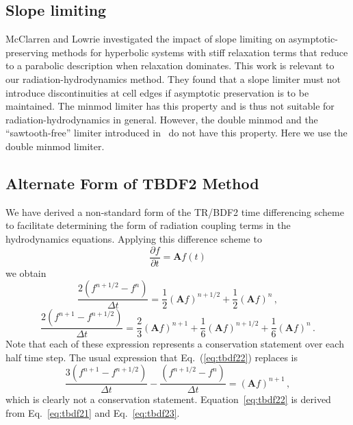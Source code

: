 \documentclass[preprint,12pt]{elsarticle}
\newcommand{\fn}[1]{\left( #1 \right)}
\newcommand{\dxdy}[2]{\frac{\partial #1}{\partial #2}}
\newcommand{\be}{\begin{equation}}
\newcommand{\ee}{\end{equation}}
\newcommand{\pec}{\, ,}
\newcommand{\pep}{\, .}
\newcommand{\lequ}[1]{\label{eq:#1}}
\newcommand{\equ}[1]{Eq.~(\ref{eq:#1})}
\newcommand{\half}{\frac{1}{2}}
\newcommand{\mA}{\mathbf{A}}
\begin{document}
\subsection{Slope limiting}
McClarren and Lowrie \cite{mclow2008} investigated the impact of slope limiting on asymptotic-preserving methods for hyperbolic systems with stiff 
relaxation terms that reduce to a parabolic description when relaxation dominates.  This work is relevant to our radiation-hydrodynamics method. 
They found that a slope limiter must not introduce discontinuities at cell edges if asymptotic preservation is to be maintained.  The minmod limiter 
has this property and is thus not suitable for radiation-hydrodynamics in general.  However, the double minmod and the ``sawtooth-free'' limiter 
introduced in~\cite{mclow2008} do not have this property.  Here we use the double minmod limiter.   


\subsection{Alternate Form of TBDF2 Method}
\label{sec:Alternate}
  We have derived a non-standard form of the TR/BDF2 time differencing scheme 
to facilitate determining the form of radiation coupling terms in the hydrodynamics equations.  Applying
this difference scheme to
\begin{equation}
    \dxdy{f}{t} = \mA f(t)
\end{equation}
we obtain
\be
\frac{2\fn{f^{n+1/2}-f^{n}}}{\Delta t} = \half (\mA f)^{n+1/2} + \half (\mA f)^{n} \pec
\lequ{tbdf21}
\ee
\be
\frac{2\fn{f^{n+1}-f^{n+1/2}}}{\Delta t} = 
\frac{2}{3} (\mA f)^{n+1} + \frac{1}{6} (\mA f)^{n+1/2} + \frac{1}{6} (\mA f)^{n} \pep
\lequ{tbdf22}
\ee
Note that each of these expression represents a conservation statement over each half time step.  
The usual expression that \equ{tbdf22} replaces is
\be
\frac{3\fn{f^{n+1}-f^{n+1/2}}}{\Delta t} - \frac{\fn{f^{n+1/2}-f^{n}}}{\Delta t}   = 
(\mA f)^{n+1} \pec
\lequ{tbdf23}
\ee
which is clearly not a conservation statement. Equation~\eqref{eq:tbdf22} is derived from Eq.~\eqref{eq:tbdf21} and Eq.~\eqref{eq:tbdf23}.
\end{document}

